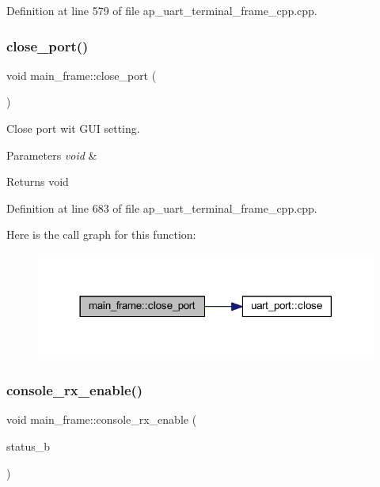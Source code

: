 Definition at line 579 of file ap\+\_\+uart\+\_\+terminal\+\_\+frame\+\_\+cpp.\+cpp.

\mbox{\label{group___u_a_r_t__terminal_ga80518617d4da98b4ec2bb667644340ac}} 
\subsubsection{close\_port()}
{\footnotesize\ttfamily void main\+\_\+frame\+::close\+\_\+port (\begin{DoxyParamCaption}\item[{void}]{ }\end{DoxyParamCaption})}



Close port wit G\+UI setting. 


\begin{DoxyParams}{Parameters}
{\em void} & \\
\hline
\end{DoxyParams}
\begin{DoxyReturn}{Returns}
void 
\end{DoxyReturn}


Definition at line 683 of file ap\+\_\+uart\+\_\+terminal\+\_\+frame\+\_\+cpp.\+cpp.

Here is the call graph for this function\+:
\nopagebreak
\begin{figure}[H]
\begin{center}
\leavevmode
\includegraphics[width=318pt]{group___u_a_r_t__terminal_ga80518617d4da98b4ec2bb667644340ac_cgraph}
\end{center}
\end{figure}
\mbox{\label{group___u_a_r_t__terminal_ga604971b0ac99b4166220b78f20758307}} 
\subsubsection{console\_rx\_enable()}
{\footnotesize\ttfamily void main\+\_\+frame\+::console\+\_\+rx\+\_\+enable (\begin{DoxyParamCaption}\item[{bool}]{status\+\_\+b }\end{DoxyParamCaption})}



